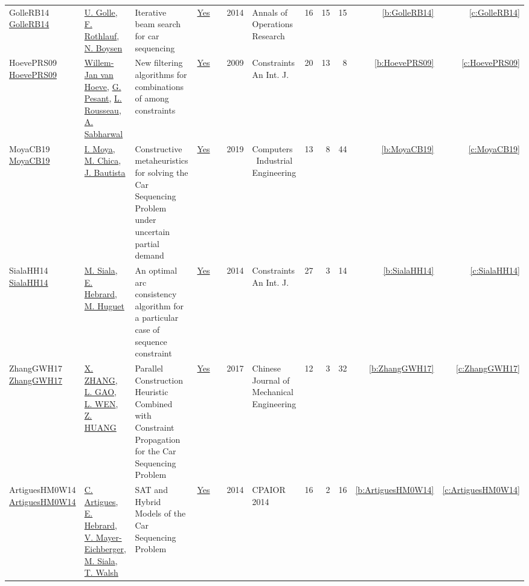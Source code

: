 {\begin{longtable}{>{\raggedright\arraybackslash}p{3cm}>{\raggedright\arraybackslash}p{6cm}>{\raggedright\arraybackslash}p{6.5cm}rrrp{2.5cm}rrrrr}
GolleRB14 \href{http://dx.doi.org/10.1007/s10479-014-1733-0}{GolleRB14} & \hyperref[auth:a61]{U. Golle}, \hyperref[auth:a62]{F. Rothlauf}, \hyperref[auth:a48]{N. Boysen} & Iterative beam search for car sequencing & \href{../cars/works/GolleRB14.pdf}{Yes} & \cite{GolleRB14} & 2014 & Annals of Operations Research & 16 & 15 & 15 & \ref{b:GolleRB14} & \ref{c:GolleRB14}\\
HoevePRS09 \href{http://dx.doi.org/10.1007/s10601-008-9067-7}{HoevePRS09} & \hyperref[auth:a39]{Willem-Jan van Hoeve}, \hyperref[auth:a40]{G. Pesant}, \hyperref[auth:a41]{L. Rousseau}, \hyperref[auth:a42]{A. Sabharwal} & New filtering algorithms for combinations of among constraints & \href{../cars/works/HoevePRS09.pdf}{Yes} & \cite{HoevePRS09} & 2009 & Constraints An Int. J. & 20 & 13 & 8 & \ref{b:HoevePRS09} & \ref{c:HoevePRS09}\\
MoyaCB19 \href{http://dx.doi.org/10.1016/j.cie.2019.106048}{MoyaCB19} & \hyperref[auth:a63]{I. Moya}, \hyperref[auth:a64]{M. Chica}, \hyperref[auth:a65]{J. Bautista} & Constructive metaheuristics for solving the Car Sequencing Problem under uncertain partial demand & \href{../cars/works/MoyaCB19.pdf}{Yes} & \cite{MoyaCB19} & 2019 & Computers \  Industrial Engineering & 13 & 8 & 44 & \ref{b:MoyaCB19} & \ref{c:MoyaCB19}\\
SialaHH14 \href{https://doi.org/10.1007/s10601-013-9150-6}{SialaHH14} & \hyperref[auth:a11]{M. Siala}, \hyperref[auth:a12]{E. Hebrard}, \hyperref[auth:a13]{M. Huguet} & An optimal arc consistency algorithm for a particular case of sequence constraint & \href{../cars/works/SialaHH14.pdf}{Yes} & \cite{SialaHH14} & 2014 & Constraints An Int. J. & 27 & 3 & 14 & \ref{b:SialaHH14} & \ref{c:SialaHH14}\\
ZhangGWH17 \href{http://dx.doi.org/10.1007/s10033-017-0083-7}{ZhangGWH17} & \hyperref[auth:a51]{X. ZHANG}, \hyperref[auth:a52]{L. GAO}, \hyperref[auth:a53]{L. WEN}, \hyperref[auth:a54]{Z. HUANG} & Parallel Construction Heuristic Combined with Constraint Propagation for the Car Sequencing Problem & \href{../cars/works/ZhangGWH17.pdf}{Yes} & \cite{ZhangGWH17} & 2017 & Chinese Journal of Mechanical Engineering & 12 & 3 & 32 & \ref{b:ZhangGWH17} & \ref{c:ZhangGWH17}\\
ArtiguesHM0W14 \href{https://doi.org/10.1007/978-3-319-07046-9_19}{ArtiguesHM0W14} & \hyperref[auth:a8]{C. Artigues}, \hyperref[auth:a12]{E. Hebrard}, \hyperref[auth:a35]{V. Mayer{-}Eichberger}, \hyperref[auth:a11]{M. Siala}, \hyperref[auth:a36]{T. Walsh} & {SAT} and Hybrid Models of the Car Sequencing Problem & \href{../cars/works/ArtiguesHM0W14.pdf}{Yes} & \cite{ArtiguesHM0W14} & 2014 & CPAIOR 2014 & 16 & 2 & 16 & \ref{b:ArtiguesHM0W14} & \ref{c:ArtiguesHM0W14}\\

\end{longtable}}
